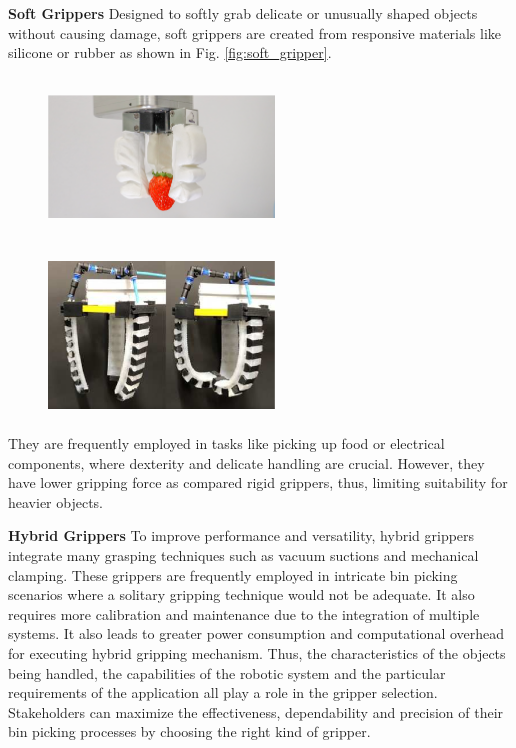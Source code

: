 \textbf{Soft Grippers} Designed to softly grab delicate or unusually shaped objects without causing damage, soft grippers are created from responsive materials like silicone or rubber as shown in Fig. \ref{fig:soft_gripper}. 
\begin{figure}
  \centering
  \begin{minipage}[t]{.45\textwidth}
    \centering
    \includegraphics[width=170pt,height=120pt]{pictures/soft_gripper.PNG}
    \label{fig:soft_gripper}
  \end{minipage}%
  \hspace{1cm}
  \begin{minipage}[t]{.45\textwidth}
    \centering
    \includegraphics[width=170pt,height=120pt]{pictures/hybrid_grippers.PNG}
    \label{fig:hybrid_gripper}
  \end{minipage}
\end{figure}
They are frequently employed in tasks like picking up food or electrical components, where dexterity and delicate handling are crucial. However, they have lower gripping force as compared rigid grippers, thus, limiting suitability for heavier objects.\cite{park2018hybrid} 

\vspace{5mm}

\textbf{Hybrid Grippers} To improve performance and versatility, hybrid grippers integrate many grasping techniques such as vacuum suctions and mechanical clamping. These grippers are frequently employed in intricate bin picking scenarios where a solitary gripping technique would not be adequate. It also requires more calibration and maintenance due to the integration of multiple systems. It also leads to greater power consumption and computational overhead for executing hybrid gripping mechanism. Thus, the characteristics of the objects being handled, the capabilities of the robotic system and the particular requirements of the application all play a role in the gripper selection. Stakeholders can maximize the effectiveness, dependability and precision of their bin picking processes by choosing the right kind of gripper.\cite{park2018hybrid} 

